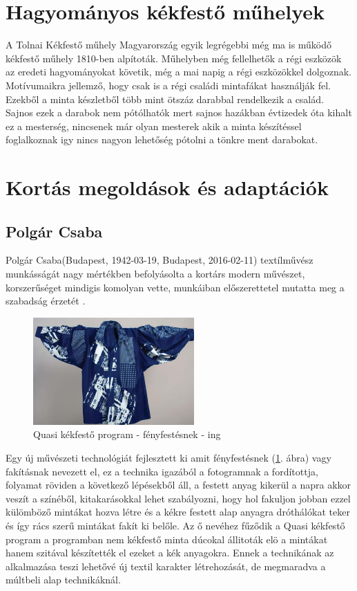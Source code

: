 \documentclass[fontsize=12pt, appendixprefix=true]{scrreprt}
\begin{document}
\section{Hagyományos kékfestő műhelyek}
A Tolnai Kékfestő műhely Magyarország  egyik legrégebbi még ma is működő kékfestő műhely 1810-ben alpítoták.
Műhelyben még fellelhetők a régi eszközök az eredeti hagyományokat követik, még a mai napig a régi eszközökkel dolgoznak.
Motívumaikra jellemző, hogy csak is a régi családi mintafákat használják fel.
Ezekből a minta készletből több mint ötszáz darabbal rendelkezik a család.
Sajnos ezek a darabok nem pótólhatók mert sajnos hazákban évtizedek óta kihalt ez a mesterség, nincsenek már olyan mesterek akik a minta készítéssel foglalkoznak igy nincs nagyon lehetőség pótolni a tönkre 
ment darabokat.

\section{Kortás megoldások és adaptációk}

\subsection{Polgár Csaba}
Polgár Csaba(Budapest, 1942-03-19, Budapest, 2016-02-11) textílművész munkásságát nagy mértékben befolyásolta a kortárs modern művészet, korszerűséget mindigis komolyan vette, munkáiban előszerettetel mutatta meg a szabadság érzetét \cite{plogarcs}.

\begin{figure}[ht!]
	\centering
	\includegraphics[width=0.55\textwidth]{img/quasi.jpg}
	\caption{Quasi kékfestő program - fényfestésnek - ing}
	\label{fig:quasi}
\end{figure}

Egy új művészeti technológiát fejlesztett ki amit fényfestésnek (\ref{fig:quasi}. ábra) vagy fakításnak nevezett el, ez a technika igazából a fotogramnak a fordítottja, folyamat röviden  a következő lépésekből áll, a festett anyag kikerül a napra akkor veszít a színéből, kitakarásokkal lehet szabályozni, hogy hol fakuljon jobban ezzel külömböző
mintákat hozva létre és a kékre festett alap anyagra dróthálókat teker és így rács szerű mintákat fakít ki belőle.
Az ő nevéhez fűződik a Quasi kékfestő program  a programban nem  kékfestő minta dúcokal állitoták elö a mintákat hanem szitával készítették el ezeket a kék anyagokra. Ennek a technikának az alkalmazása teszi lehetővé új textil karakter  létrehozását, de megmaradva a múltbeli alap technikáknál.
\end{document}
